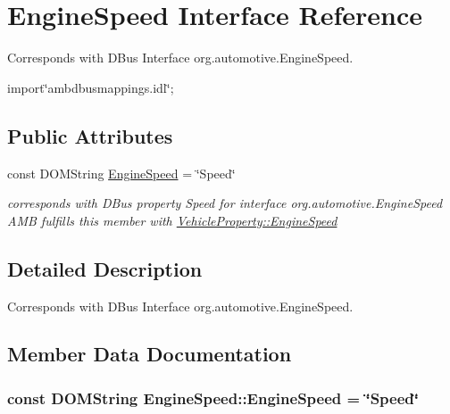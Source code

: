 \hypertarget{interfaceEngineSpeed}{\section{Engine\+Speed Interface Reference}
\label{interfaceEngineSpeed}
}


Corresponds with D\+Bus Interface org.\+automotive.\+Engine\+Speed.  




{\ttfamily import\char`\"{}ambdbusmappings.\+idl\char`\"{};}

\subsection*{Public Attributes}
\begin{DoxyCompactItemize}
\item 
const D\+O\+M\+String \hyperlink{interfaceEngineSpeed_ac3274655997a773e5ba9d9d7c0f7dd03}{Engine\+Speed} = \char`\"{}Speed\char`\"{}
\begin{DoxyCompactList}\small\item\em corresponds with D\+Bus property Speed for interface org.\+automotive.\+Engine\+Speed A\+M\+B fulfills this member with \hyperlink{classVehicleProperty_a7949fe3d031814fc2644de14f8cec9a0}{Vehicle\+Property\+::\+Engine\+Speed} \end{DoxyCompactList}\end{DoxyCompactItemize}


\subsection{Detailed Description}
Corresponds with D\+Bus Interface org.\+automotive.\+Engine\+Speed. 

\subsection{Member Data Documentation}
\hypertarget{interfaceEngineSpeed_ac3274655997a773e5ba9d9d7c0f7dd03}{
\subsubsection[{Engine\+Speed}]{\setlength{\rightskip}{0pt plus 5cm}const D\+O\+M\+String Engine\+Speed\+::\+Engine\+Speed = \char`\"{}Speed\char`\"{}}}\label{interfaceEngineSpeed_ac3274655997a773e5ba9d9d7c0f7dd03}


